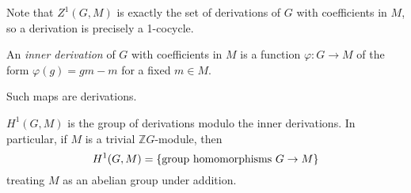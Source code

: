 Note that \( Z^1(G, M) \) is exactly the set of derivations of \( G \) with coefficients in \( M \), so a derivation is precisely a 1-cocycle.
\begin{definition}
    An \emph{inner derivation} of \( G \) with coefficients in \( M \) is a function \( \varphi : G \to M \) of the form \( \varphi(g) = gm - m \) for a fixed \( m \in M \).
\end{definition}
Such maps are derivations.
\begin{corollary}
    \( H^1(G, M) \) is the group of derivations modulo the inner derivations.
    In particular, if \( M \) is a trivial \( \mathbb Z G \)-module, then
    \[ H^1(G, M) = \qty{\text{group homomorphisms } G \to M} \]
    treating \( M \) as an abelian group under addition.
\end{corollary}

